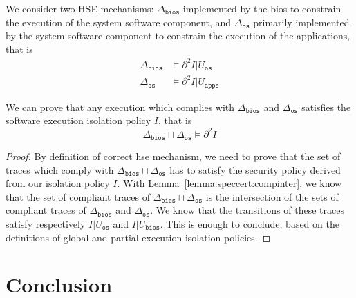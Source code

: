 \begin{example}
  We consider two HSE mechanisms: $\Delta_\mathtt{bios}$ implemented by the
  \ac{bios} to constrain the execution of the system software component, and
  $\Delta_\mathtt{os}$ primarily implemented by the system software component to
  constrain the execution of the applications, that is
  \[
    \begin{array}{cl}
      \Delta_{\mathtt{bios}}
      & \models \partial^2 I|U_{\mathtt{os}} \\
      \Delta_{\mathtt{os}} & \models
                             \partial^2 I|U_{\mathtt{apps}}
    \end{array}
  \]

  We can prove that any execution which complies with $\Delta_\mathtt{bios}$ and
  $\Delta_\mathtt{os}$ satisfies the software execution isolation policy $I$,
  that is
  \[
    \Delta_{\mathtt{bios}} \sqcap \Delta_{\mathtt{os}} \models \partial^2 I
  \]

  \begin{proof}
    By definition of correct \ac{hse} mechanism, we need to prove that the set
    of traces which comply with
    $\Delta_{\mathtt{bios}} \sqcap \Delta_{\mathtt{os}}$ has to satisfy the
    security policy derived from our isolation policy $I$.
    With Lemma~\ref{lemma:speccert:compinter}, we know that the set of compliant
    traces of $\Delta_{\mathtt{bios}} \sqcap \Delta_{\mathtt{os}}$ is the
    intersection of the sets of compliant traces of $\Delta_{\mathtt{bios}}$ and
    $\Delta_{\mathtt{os}}$.
    We know that the transitions of these traces satisfy respectively
    $I|U_{\mathtt{os}}$ and $I|U_{\mathtt{bios}}$.
    This is enough to conclude, based on the definitions of global and partial
    execution isolation policies.
  \end{proof}
\end{example}

\section{Conclusion}

